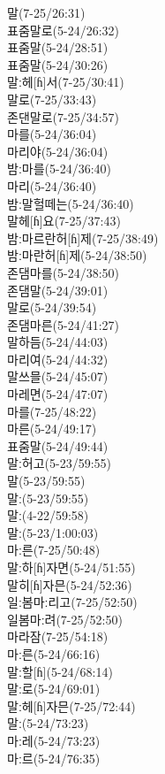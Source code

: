 {말(7-25/26:31) \\
표줌말로(5-24/26:32) \\
표줌말(5-24/28:51) \\
표줌말(5-24/30:26) \\
말ː헤[ɦ]서(7-25/30:41) \\
말로(7-25/33:43) \\
존댄말로(7-25/34:57) \\
마를(5-24/36:04) \\
마리야(5-24/36:04) \\
밤ː마를(5-24/36:40) \\
마리(5-24/36:40) \\
밤ː말헐떼는(5-24/36:40) \\
말헤[ɦ]요(7-25/37:43) \\
밤ː마르란허[ɦ]제(7-25/38:49) \\
밤ː마란허[ɦ]제(5-24/38:50) \\
존댐마를(5-24/38:50) \\
존댐말(5-24/39:01) \\
말로(5-24/39:54) \\
존댐마른(5-24/41:27) \\
말하듬(5-24/44:03) \\
마리여(5-24/44:32) \\
말쓰믈(5-24/45:07) \\
마레면(5-24/47:07) \\
마를(7-25/48:22) \\
마른(5-24/49:17) \\
표줌말(5-24/49:44) \\
말ː허고(5-23/59:55) \\
말(5-23/59:55) \\
말ː(5-23/59:55) \\
말ː(4-22/59:58) \\
말ː(5-23/1:00:03) \\
마ː른(7-25/50:48) \\
말ː하[ɦ]자면(5-24/51:55) \\
말히[ɦ]자믄(5-24/52:36) \\
일ː봄마ː리고(7-25/52:50) \\
일봄마ː려(7-25/52:50) \\
마라잠(7-25/54:18) \\
마ː른(5-24/66:16) \\
말ː할[ɦ](5-24/68:14) \\
말ː로(5-24/69:01) \\
말ː헤[ɦ]자믄(7-25/72:44) \\
말ː(5-24/73:23) \\
마ː레(5-24/73:23) \\
마ː르(5-24/76:35)}
